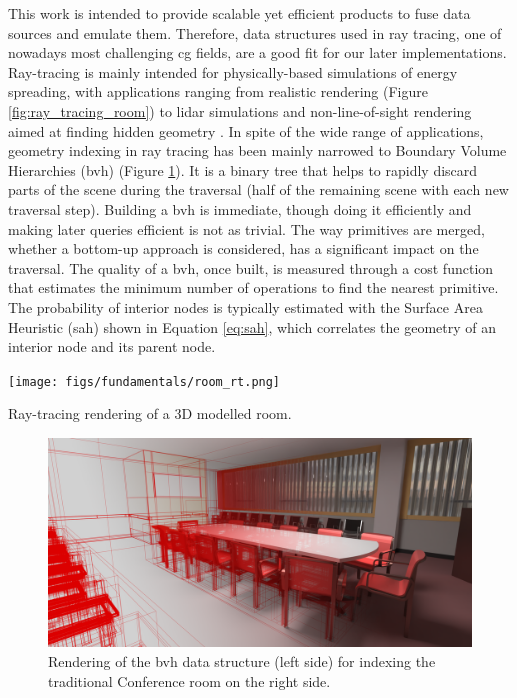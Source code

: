 This work is intended to provide scalable yet efficient products to fuse data sources and emulate them. Therefore, data structures used in ray tracing, one of nowadays most challenging \acrshort{cg} fields, are a good fit for our later implementations. Ray-tracing is mainly intended for physically-based simulations of energy spreading, with applications ranging from realistic rendering (Figure \ref{fig:ray_tracing_room}) to \acrshort{lidar} simulations and non-line-of-sight rendering aimed at finding hidden geometry \cite{royo_non-line--sight_2022}. In spite of the wide range of applications, geometry indexing in ray tracing has been mainly narrowed to Boundary Volume Hierarchies (\acrshort{bvh}) \cite{meister_survey_2021} (Figure \ref{fig:bvh_raytracing}). It is a binary tree that helps to rapidly discard parts of the scene during the traversal (half of the remaining scene with each new traversal step). Building a \acrshort{bvh} is immediate, though doing it efficiently and making later queries efficient is not as trivial. The way primitives are merged, whether a bottom-up approach is considered, has a significant impact on the traversal. The quality of a \acrshort{bvh}, once built, is measured through a cost function that estimates the minimum number of operations to find the nearest primitive. The probability of interior nodes is typically estimated with the Surface Area Heuristic (\acrshort{sah}) shown in Equation \ref{eq:sah}, which correlates the geometry of an interior node and its parent node. 
\begin{marginfigure}[-5.0cm]
    \texttt{[image: figs/fundamentals/room\_rt.png]}
	\caption{Ray-tracing rendering of a 3D modelled room. }
    \label{fig:ray_tracing_room}
\end{marginfigure}

\begin{figure}[ht]
	\includegraphics[width=\textwidth]{figs/fundamentals/bvh_raytracing.png}
	\caption{Rendering of the \acrshort{bvh} data structure (left side) for indexing the traditional Conference room \cite{mcguire_computer_2017} on the right side. }
    \label{fig:bvh_raytracing}
\end{figure}

